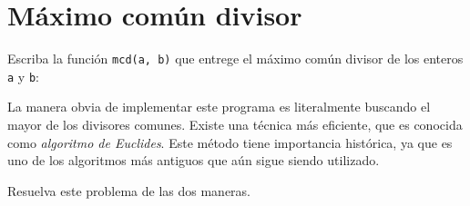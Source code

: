 \section{Máximo común divisor}

Escriba la función \lstinline!mcd(a, b)! que entrege el
máximo común divisor de los enteros \lstinline!a! y \lstinline!b!:

La manera obvia de implementar este programa es literalmente buscando el
mayor de los divisores comunes. Existe una técnica más eficiente, que es
conocida como \emph{algoritmo de Euclides}\footnotemark.
Este método tiene importancia histórica, ya que es uno de
los algoritmos más antiguos que aún sigue siendo utilizado.

Resuelva este problema de las dos maneras.



